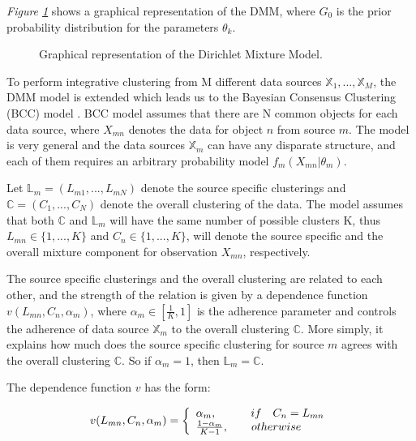 \emph{Figure \ref{fdmm-pic}} shows a graphical representation of the DMM, where $G_{0}$ is the prior probability distribution for the parameters $\theta_{k}$.

\begin{figure}[ht]
  \begin{center}
      
  \caption{Graphical representation of the Dirichlet Mixture Model.}
  \label{fdmm-pic}
  \end{center}
\end{figure}

To perform integrative clustering from M different data sources $\mathbb{X}_{1},..., \mathbb{X}_{M}$, the DMM model is extended which leads us to the Bayesian Consensus Clustering (BCC) model \cite{Lock2013}. BCC model assumes that there are N common objects for each data source, where $X_{mn}$ denotes the data for object $n$ from source $m$.
The model is very general and the data sources $\mathbb{X}_{m}$ can have any disparate structure, and each of them requires an arbitrary probability model $f_{m}(X_{mn}|\theta_{m})$.

Let $\mathbb{L}_{m} = (L_{m1},...,L_{mN})$ denote the source specific clusterings and $\mathbb{C} = (C_{1},...,C_{N})$ denote the overall clustering of the data. The model assumes that both $\mathbb{C}$ and $\mathbb{L}_{m}$ will have the same number of possible clusters K, thus $L_{mn} \in \lbrace 1,...,K \rbrace$ and $C_{n} \in \lbrace 1,...,K \rbrace$, will denote the source specific and the overall mixture component for observation $X_{mn}$, respectively.

The source specific clusterings and the overall clustering are related to each other, and the strength of the relation is given by a dependence function $v(L_{mn}, C_{n}, \alpha_{m})$, where $\alpha_{m} \in [\frac{1}{K}, 1]$ is the adherence parameter and controls the adherence of data source $\mathbb{X}_m$ to the overall clustering $\mathbb{C}$. More simply, it explains how much does the source specific clustering for source $m$ agrees with the overall clustering $\mathbb{C}$. So if $\alpha_{m} = 1$, then $\mathbb{L}_{m} = \mathbb{C}$. 

The dependence function $v$ has the form:

\begin{equation}
	v(L_{mn}, C_{n}, \alpha_{m}) = \left\{
	\begin{array}{l l}
		\alpha_{m},\quad \quad \quad if\quad C_{n} = L_{mn}\\
		\frac{1-\alpha_{m}}{K-1},\quad \quad otherwise
	\end{array}\right.
\end{equation}

